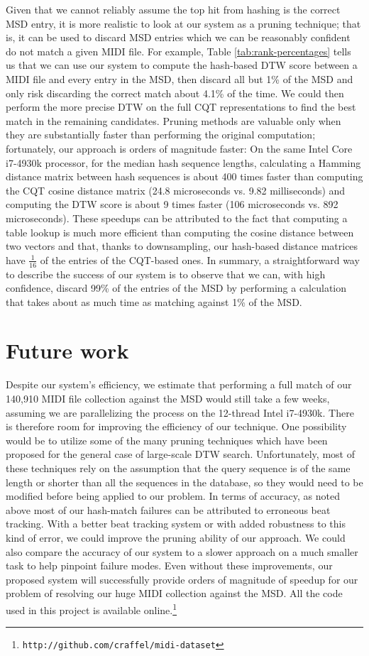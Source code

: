 \documentclass{article}
\begin{document}
Given that we cannot reliably assume the top hit from hashing is the correct MSD entry, it is more realistic to look at our system as a pruning technique; that is, it can be used to discard MSD entries which we can be reasonably confident do not match a given MIDI file.
For example, Table \ref{tab:rank-percentages} tells us that we can use our system to compute the hash-based DTW score between a MIDI file and every entry in the MSD, then discard all but 1\% of the MSD and only risk discarding the correct match about 4.1\% of the time.
We could then perform the more precise DTW on the full CQT representations to find the best match in the remaining candidates.
Pruning methods are valuable only when they are substantially faster than performing the original computation; fortunately, our approach is orders of magnitude faster:
On the same Intel Core i7-4930k processor, for the median hash sequence lengths, calculating a Hamming distance matrix between hash sequences is about 400 times faster than computing the CQT cosine distance matrix (24.8 microseconds vs. 9.82 milliseconds) and computing the DTW score is about 9 times faster (106 microseconds vs. 892 microseconds).
These speedups can be attributed to the fact that computing a table lookup is much more efficient than computing the cosine distance between two vectors and that, thanks to downsampling, our hash-based distance matrices have $\frac{1}{16}$ of the entries of the CQT-based ones.
In summary, a straightforward way to describe the success of our system is to observe that we can, with high confidence, discard 99\% of the entries of the MSD by performing a calculation that takes about as much time as matching against 1\% of the MSD.

\section{Future work}

Despite our system's efficiency, we estimate that performing a full match of our 140,910 MIDI file collection against the MSD would still take a few weeks, assuming we are parallelizing the process on the 12-thread Intel i7-4930k.
There is therefore room for improving the efficiency of our technique.
One possibility would be to utilize some of the many pruning techniques which have been proposed for the general case of large-scale DTW search.
Unfortunately, most of these techniques rely on the assumption that the query sequence is of the same length or shorter than all the sequences in the database, so they would need to be modified before being applied to our problem.
In terms of accuracy, as noted above most of our hash-match failures can be attributed to erroneous beat tracking.
With a better beat tracking system or with added robustness to this kind of error, we could improve the pruning ability of our approach.
We could also compare the accuracy of our system to a slower approach on a much smaller task to help pinpoint failure modes.
Even without these improvements, our proposed system will successfully provide orders of magnitude of speedup for our problem of resolving our huge MIDI collection against the MSD.
All the code used in this project is available online.\footnote{\texttt{http://github.com/craffel/midi-dataset}}
\end{document}
